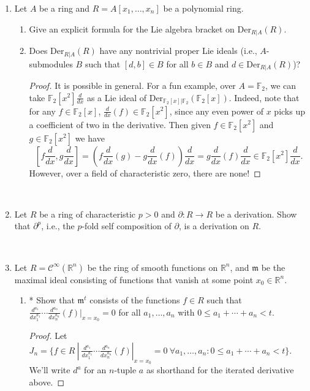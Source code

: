 \documentclass{amsart}[12pt]
\newcommand{\R}{{\mathbb{R}}}
\newcommand{\fm}{{\mathfrak m}}
\numberwithin{equation}{section}
\theoremstyle{plain} %
\theoremstyle{definition}
\theoremstyle{remark}
\newcommand{\Der}{\mathrm{Der}}
\begin{document}
\begin{enumerate}
\item Let $A$ be a ring and $R=A[x_1,\dots,x_n]$ be a polynomial ring.
\begin{enumerate}
\item Give an explicit formula for the Lie algebra bracket on $\Der_{R|A}(R)$.
\item Does $\Der_{R|A}(R)$ have any nontrivial proper Lie ideals (i.e., $A$-submodules $B$ such that $[d,b]\in B$ for all $b\in B$ and $d\in \Der_{R|A}(R)$)?
\begin{proof}
It is possible in general. For a fun example, over $A=\mathbb{F}_2$, we can take $\mathbb{F}_2[x^2] \frac{d}{dx}$ as a Lie ideal of $\Der_{\mathbb{F}_2[x]|\mathbb{F}_2}(\mathbb{F}_2[x])$. Indeed, note that for any $f\in \mathbb{F}_2[x]$, $\frac{d}{dx}(f) \in \mathbb{F}_2[x^2]$, since any even power of $x$ picks up a coefficient of two in the derivative. Then given $f\in \mathbb{F}_2[x^2]$ and $g\in \mathbb{F}_2[x^2]$ we have \[ [f\frac{d}{dx}, g \frac{d}{dx}] = (f \frac{d}{dx}(g) - g \frac{d}{dx}(f)) \frac{d}{dx} =g \frac{d}{dx}(f) \frac{d}{dx} \in \mathbb{F}_2[x^2] \frac{d}{dx}.\]
However, over a field of characteristic zero, there are none!
\end{proof}
\end{enumerate}


\


\item Let $R$ be a ring of characteristic $p>0$ and $\partial:R\to R$ be a derivation. Show that $\partial^p$, i.e., the $p$-fold self composition of $\partial$, is a derivation on $R$.

\

\item Let $R=\mathcal{C}^\infty(\R^n)$ be the ring of smooth functions on $\R^n$, and $\fm$ be the maximal ideal consisting of functions that vanish at some point $x_0\in \R^n$.
\begin{enumerate}
\item * Show that $\fm^t$ consists of the functions $f\in R$ such that $\frac{d^{a_1}}{dx_1^{a_1}} \cdots \frac{d^{a_n}}{dx_n^{a_n}}(f)|_{x=x_0} = 0$ for all $a_1,\dots,a_n$ with $0
\leq a_1+\cdots+a_n<t$.
\begin{proof}
Let $J_n= \{ f\in R \ | \ \frac{d^{a_1}}{dx_1^{a_1}} \cdots \frac{d^{a_n}}{dx_n^{a_n}}(f)|_{x=x_0} = 0\ \forall a_1,\dots,a_n:0
\leq a_1+\cdots+a_n<t\}$. We'll write $d^a$ for an $n$-tuple $a$ as shorthand for the iterated derivative above. 


\end{proof}
\end{enumerate}
\end{enumerate}
\end{document}
